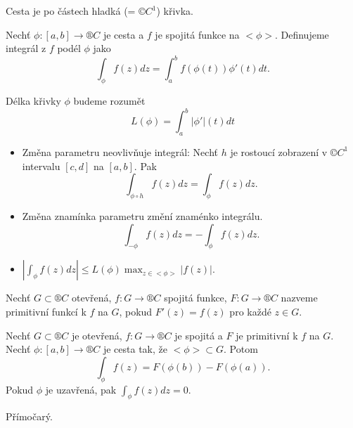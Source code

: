 \documentclass[12pt]{article}					%
\begin{document}
\begin{definice}[Cesta]
	Cesta je po částech hladká (= $©C^1$) křivka.
\end{definice}

\begin{definice}
	Nechť $\phi: [a, b] \rightarrow ®C$ je cesta a $f$ je spojitá funkce na $<\phi>$. Definujeme integrál z $f$ podél $\phi$ jako
	$$ \int_\phi f(z) dz = \int_a^b f(\phi(t))\phi'(t) dt. $$

	Délka křivky $\phi$ budeme rozumět
	$$ L(\phi) = \int_a^b |\phi'|(t)dt $$
\end{definice}

\begin{poznamka}
	\begin{itemize}
		\item Změna parametru neovlivňuje integrál: Nechť $h$ je rostoucí zobrazení v $©C^1$ intervalu $[c, d]$ na $[a, b]$. Pak
			$$ \int_{\phi \circ h} f(z) dz = \int_\phi f(z) dz. $$
		\item Změna znamínka parametru změní znaménko integrálu.
			$$ \int_{-\phi} f(z) dz = -\int_\phi f(z) dz. $$
		\item $|\int_\phi f(z)dz| ≤ L(\phi)\max_{z \in <\phi>}|f(z)|$.
	\end{itemize}
\end{poznamka}

\begin{definice}
	Nechť $G \subset ®C$ otevřená, $f: G \rightarrow ®C$ spojitá funkce, $F: G \rightarrow ®C$ nazveme primitivní funkcí k $f$ na $G$, pokud $F'(z) = f(z)$ pro každé $z \in G$.
\end{definice}

\begin{veta}
	Nechť $G \subset ®C$ je otevřená, $f: G \rightarrow ®C$ je spojitá a $F$ je primitivní k $f$ na $G$. Nechť $\phi: [a, b] \rightarrow ®C$ je cesta tak, že $<\phi> \subset G$. Potom
	$$ \int_\phi f(z) = F(\phi(b)) - F(\phi(a)). $$
	Pokud $\phi$ je uzavřená, pak $\int_\phi f(z) dz = 0$.

	\begin{dukazin}
		Přímočarý.
	\end{dukazin}
\end{veta}
\end{document}
